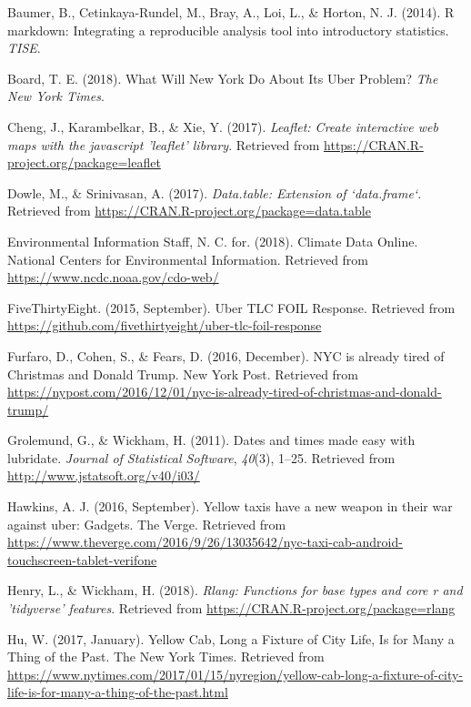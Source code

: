 \documentclass[12pt,twoside]{reedthesis}
\theoremstyle{definition}
\theoremstyle{definition}
\theoremstyle{definition}
\theoremstyle{remark}
\begin{document}
\hypertarget{ref-baumer2014}{}
Baumer, B., Cetinkaya-Rundel, M., Bray, A., Loi, L., \& Horton, N. J.
(2014). R markdown: Integrating a reproducible analysis tool into
introductory statistics. \emph{TISE}.

\hypertarget{ref-nytimes2018}{}
Board, T. E. (2018). What Will New York Do About Its Uber Problem?
\emph{The New York Times}.

\hypertarget{ref-pkgleaflet}{}
Cheng, J., Karambelkar, B., \& Xie, Y. (2017). \emph{Leaflet: Create
interactive web maps with the javascript 'leaflet' library}. Retrieved
from \url{https://CRAN.R-project.org/package=leaflet}

\hypertarget{ref-pkgdatatable}{}
Dowle, M., \& Srinivasan, A. (2017). \emph{Data.table: Extension of
`data.frame`}. Retrieved from
\url{https://CRAN.R-project.org/package=data.table}

\hypertarget{ref-noaa}{}
Environmental Information Staff, N. C. for. (2018). Climate Data Online.
National Centers for Environmental Information. Retrieved from
\url{https://www.ncdc.noaa.gov/cdo-web/}

\hypertarget{ref-uber538}{}
FiveThirtyEight. (2015, September). Uber TLC FOIL Response. Retrieved
from \url{https://github.com/fivethirtyeight/uber-tlc-foil-response}

\hypertarget{ref-furfaro2016}{}
Furfaro, D., Cohen, S., \& Fears, D. (2016, December). NYC is already
tired of Christmas and Donald Trump. New York Post. Retrieved from
\url{https://nypost.com/2016/12/01/nyc-is-already-tired-of-christmas-and-donald-trump/}

\hypertarget{ref-pkglubridate}{}
Grolemund, G., \& Wickham, H. (2011). Dates and times made easy with
lubridate. \emph{Journal of Statistical Software}, \emph{40}(3), 1--25.
Retrieved from \url{http://www.jstatsoft.org/v40/i03/}

\hypertarget{ref-andrew2016}{}
Hawkins, A. J. (2016, September). Yellow taxis have a new weapon in
their war against uber: Gadgets. The Verge. Retrieved from
\url{https://www.theverge.com/2016/9/26/13035642/nyc-taxi-cab-android-touchscreen-tablet-verifone}

\hypertarget{ref-pkgrlang}{}
Henry, L., \& Wickham, H. (2018). \emph{Rlang: Functions for base types
and core r and 'tidyverse' features}. Retrieved from
\url{https://CRAN.R-project.org/package=rlang}

\hypertarget{ref-hu2017}{}
Hu, W. (2017, January). Yellow Cab, Long a Fixture of City Life, Is for
Many a Thing of the Past. The New York Times. Retrieved from
\url{https://www.nytimes.com/2017/01/15/nyregion/yellow-cab-long-a-fixture-of-city-life-is-for-many-a-thing-of-the-past.html}
\end{document}
